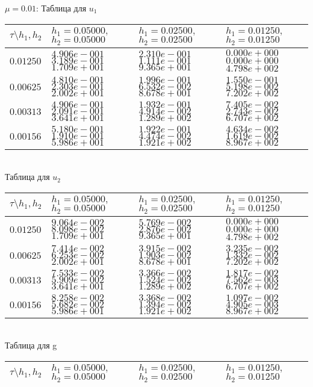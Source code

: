 \documentclass[a4paper]{article}
\theoremstyle{definition}
\numberwithin{equation}{section}
\begin{document}
\begin{center}

$\mu=0.01$: Таблица для $u_1$

\begin{tabular}{|p{0.8in}|p{1.2in}|p{1.2in}|p{1.2in}|} \hline
$\tau\setminus h_1, h_2$ & $h_1=0.05000 ,$ $h_2=0.05000$& $h_1=0.02500 ,$ $h_2=0.02500$& $h_1=0.01250 ,$ $h_2=0.01250$\\ \hline

$0.01250$ & $4.906e-001$ $3.189e-001$ $1.709e+001$ &$2.310e-001$ $1.111e-001$ $9.365e+001$ &$0.000e+000$ $0.000e+000$ $4.798e+002$  \\ \hline
$0.00625$ & $4.810e-001$ $2.303e-001$ $2.002e+001$ &$1.996e-001$ $6.532e-002$ $8.678e+001$ &$1.550e-001$ $5.198e-002$ $7.202e+002$  \\ \hline
$0.00313$ & $4.906e-001$ $2.091e-001$ $3.641e+001$ &$1.932e-001$ $4.914e-002$ $1.289e+002$ &$7.405e-002$ $2.743e-002$ $6.707e+002$  \\ \hline
$0.00156$ & $5.180e-001$ $1.910e-001$ $5.986e+001$ &$1.922e-001$ $4.474e-002$ $1.921e+002$ &$4.634e-002$ $1.619e-002$ $8.967e+002$  \\ \hline
\end{tabular}\\[20pt]
Таблица для $u_2$

\begin{tabular}{|p{0.8in}|p{1.2in}|p{1.2in}|p{1.2in}|} \hline
$\tau\setminus h_1, h_2$ & $h_1=0.05000 ,$ $h_2=0.05000$& $h_1=0.02500 ,$ $h_2=0.02500$& $h_1=0.01250 ,$ $h_2=0.01250$\\ \hline

$0.01250$ & $9.064e-002$ $8.098e-002$ $1.709e+001$ &$5.769e-002$ $2.876e-002$ $9.365e+001$ &$0.000e+000$ $0.000e+000$ $4.798e+002$  \\ \hline
$0.00625$ & $7.414e-002$ $6.253e-002$ $2.002e+001$ &$3.915e-002$ $1.903e-002$ $8.678e+001$ &$3.235e-002$ $1.332e-002$ $7.202e+002$  \\ \hline
$0.00313$ & $7.533e-002$ $5.909e-002$ $3.641e+001$ &$3.366e-002$ $1.524e-002$ $1.289e+002$ &$1.817e-002$ $7.562e-003$ $6.707e+002$  \\ \hline
$0.00156$ & $8.258e-002$ $5.682e-002$ $5.986e+001$ &$3.368e-002$ $1.394e-002$ $1.921e+002$ &$1.097e-002$ $4.905e-003$ $8.967e+002$  \\ \hline
\end{tabular}\\[20pt]
\newpage
Таблица для g
 
\begin{tabular}{|p{0.8in}|p{1.2in}|p{1.2in}|p{1.2in}|} \hline
$\tau\setminus h_1, h_2$ & $h_1=0.05000 ,$ $h_2=0.05000$& $h_1=0.02500 ,$ $h_2=0.02500$& $h_1=0.01250 ,$ $h_2=0.01250$ \\ \hline


\end{tabular}
\end{center}
\end{document}
